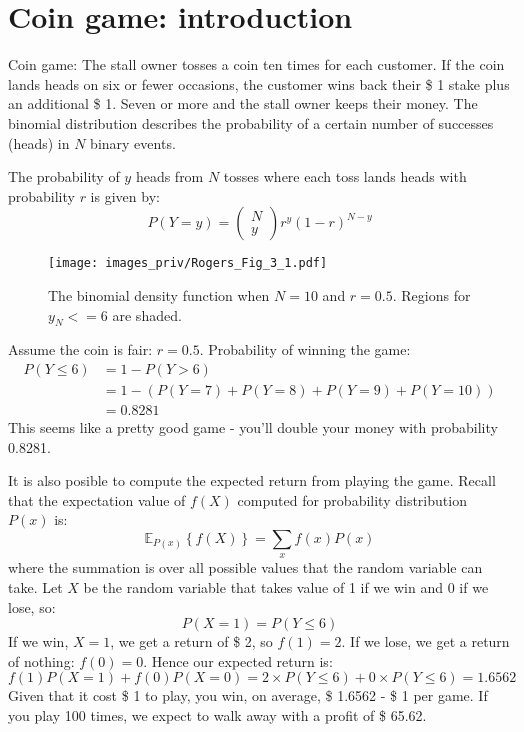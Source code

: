 \section{Coin game: introduction}

Coin game: The stall owner tosses a coin ten times
for each customer. If the coin lands heads on six or fewer occasions, the customer
wins back their \$ 1 stake plus an additional \$ 1.
Seven or more and the stall owner
keeps their money. The binomial distribution describes
the probability of a certain number of successes (heads) in $N$ binary events.

The probability of $y$ heads from $N$ tosses where each toss lands heads with probability
$r$ is given by:
\begin{equation}
P(Y=y) = \begin{pmatrix}
N \\ y
\end{pmatrix} r^{y} (1 - r)^{N-y}
\label{eq:binomialdist}
\end{equation}

\begin{figure}[h]
{\centering
\texttt{[image: images\_priv/Rogers\_Fig\_3\_1.pdf]}
\par}
\caption{The binomial density function when $N = 10$ and $r = 0.5$.
Regions for $y_N <= 6$ are shaded.}
\label{fig:Rogers_3_1}
\end{figure}


Assume the coin is fair: $r = 0.5$.
Probability of winning the game:
\begin{align*}
P(Y \leq 6) & = 1 - P(Y > 6) \\
& = 1 - \left ( P(Y=7) + P(Y=8) + P(Y=9) + P(Y=10) \right ) \\
& = 0.8281
\end{align*}
This seems like a pretty good game - you'll double your money with probability
0.8281.

It is also posible to compute the expected return from playing the game. 
Recall that the expectation value of $f(X)$ computed for probability distribution
$P(x)$ is:
\begin{equation*}
\mathbb{E}_{P(x)}\left\{ f(X) \right\} = \sum_{x} f(x) P(x)
\end{equation*}
where the summation is over all possible values that the random variable can take.
Let $X$ be the random variable that takes value of 1 if we win and 0 if we lose, so:
\begin{equation*}
P(X = 1) = P(Y \leq 6)
\end{equation*}
If we win, $X = 1$, we get a return of \$ 2, so $f(1) = 2$. If we lose, we get a return of
nothing: $f(0) = 0$. Hence our expected return is:
\begin{equation*}
f(1) P(X=1) + f(0) P(X=0) = 2 \times P(Y \leq 6) + 0 \times P(Y \le 6) = 1.6562
\end{equation*}
Given that it cost \$ 1 to play, you win, on average, \$ 1.6562 - \$ 1 per game.
If you play 100 times, we expect to walk away with a profit of \$ 65.62.

